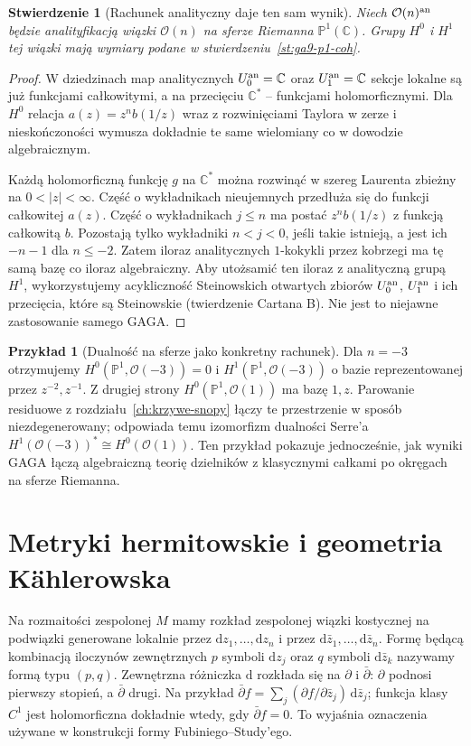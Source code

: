 \documentclass[11pt,a4paper,openany]{report}
\numberwithin{equation}{section}
\theoremstyle{plain}
\newtheorem{stwierdzenie}[twierdzenie]{Stwierdzenie}
\theoremstyle{definition}
\newtheorem{przyklad}[twierdzenie]{Przykład}
\theoremstyle{remark}
\newcommand{\C}{\mathbb C}
\newcommand{\PP}{\mathbb P}
\begin{document}
\begin{stwierdzenie}[Rachunek analityczny daje ten sam wynik]
\label{st:ga9-p1-analytic}
Niech $\mathcal O(n)^{\rm an}$ będzie analityfikacją
wiązki $\mathcal O(n)$ na sferze Riemanna
$\PP^1(\C)$. Grupy $H^0$ i $H^1$ tej wiązki
mają wymiary podane w
stwierdzeniu~\ref{st:ga9-p1-coh}.
\end{stwierdzenie}
\begin{proof}
W dziedzinach map analitycznych $U_0^{\rm an}=\C$ oraz
$U_1^{\rm an}=\C$ sekcje lokalne są już funkcjami
całkowitymi, a na przecięciu $\C^*$ -- funkcjami
holomorficznymi. Dla $H^0$ relacja
$a(z)=z^n b(1/z)$ wraz z rozwinięciami Taylora
w zerze i nieskończoności wymusza dokładnie
te same wielomiany co w dowodzie algebraicznym.

Każdą holomorficzną funkcję $g$ na $\C^*$ można
rozwinąć w szereg Laurenta zbieżny na
$0<|z|<\infty$. Część o wykładnikach nieujemnych
przedłuża się do funkcji całkowitej $a(z)$.
Część o wykładnikach $j\le n$ ma postać
$z^n b(1/z)$ z funkcją całkowitą $b$.
Pozostają tylko wykładniki $n<j<0$, jeśli takie
istnieją, a jest ich $-n-1$ dla $n\le-2$.
Zatem iloraz analitycznych $1$-kokykli przez
kobrzegi ma tę samą bazę co iloraz algebraiczny.
Aby utożsamić ten iloraz z analityczną grupą
$H^1$, wykorzystujemy acykliczność Steinowskich
otwartych zbiorów $U_0^{\rm an}$, $U_1^{\rm an}$
i ich przecięcia, które są Steinowskie (twierdzenie Cartana B).
Nie jest to niejawne zastosowanie samego GAGA.
\end{proof}

\begin{przyklad}[Dualność na sferze jako konkretny rachunek]
Dla $n=-3$ otrzymujemy $H^0(\PP^1,\mathcal O(-3))=0$
i $H^1(\PP^1,\mathcal O(-3))$ o bazie reprezentowanej
przez $z^{-2},z^{-1}$. Z drugiej strony
$H^0(\PP^1,\mathcal O(1))$ ma bazę $1,z$.
Parowanie residuowe z rozdziału~\ref{ch:krzywe-snopy}
łączy te przestrzenie w sposób niezdegenerowany;
odpowiada temu izomorfizm dualności Serre'a
$H^1(\mathcal O(-3))^*\cong H^0(\mathcal O(1))$.
Ten przykład pokazuje jednocześnie, jak wyniki GAGA
łączą algebraiczną teorię dzielników z klasycznymi
całkami po okręgach na sferze Riemanna.
\end{przyklad}

\section{Metryki hermitowskie i geometria Kählerowska}
\label{sec:ga9-kahler}

Na rozmaitości zespolonej $M$ mamy rozkład zespolonej
wiązki kostycznej na podwiązki generowane lokalnie przez
$\mathrm dz_1,\ldots,\mathrm dz_n$ i przez
$\mathrm d\bar z_1,\ldots,\mathrm d\bar z_n$.
Formę będącą kombinacją iloczynów zewnętrznych $p$ symboli
$\mathrm dz_j$ oraz $q$ symboli $\mathrm d\bar z_k$
nazywamy formą typu $(p,q)$. Zewnętrzna różniczka
$\mathrm d$ rozkłada się na $\partial$ i $\bar\partial$:
$\partial$ podnosi pierwszy stopień, a $\bar\partial$ drugi.
Na przykład $\bar\partial f=\sum_j
(\partial f/\partial\bar z_j)\,\mathrm d\bar z_j$;
funkcja klasy $C^1$ jest holomorficzna dokładnie wtedy,
gdy $\bar\partial f=0$. To wyjaśnia oznaczenia używane
w konstrukcji formy Fubiniego--Study'ego.
\end{document}
